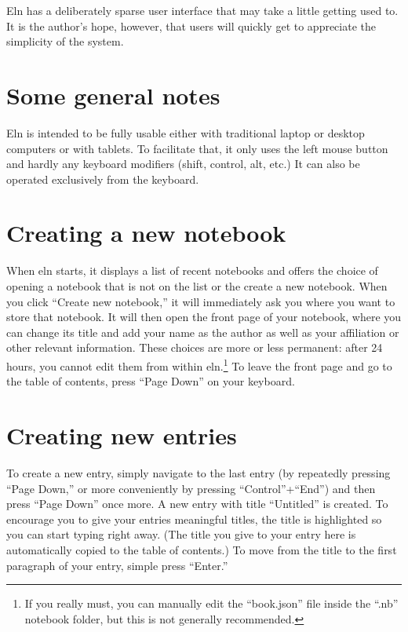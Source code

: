 \documentclass[11pt]{report}
\begin{document}
Eln has a deliberately sparse user interface that may take a little
getting used to. It is the author's hope, however, that users will
quickly get to appreciate the simplicity of the system.

\section{Some general notes}

Eln is intended to be fully usable either with traditional laptop or desktop
computers or with tablets. To facilitate that, it only uses the left
mouse button and hardly any keyboard modifiers (shift, control, alt,
etc.) It can also be operated exclusively from the keyboard.

\section{Creating a new notebook}

When eln starts, it displays a list of recent notebooks and offers the
choice of opening a notebook that is not on the list or the create a
new notebook. When you click ``Create new notebook,'' it will
immediately ask you where you want to store that notebook. It will
then open the front page of your notebook, where you can change its
title and add your name as the author as well as your affiliation or
other relevant information. These choices are more or less permanent:
after 24 hours, you cannot edit them from within eln.\footnote{If you
  really must, you can manually edit the ``book.json'' file inside the
  ``.nb'' notebook folder, but this is not generally recommended.} To
leave the front page and go to the table of contents, press ``Page
Down'' on your keyboard.

\section{Creating new entries}

To create a new entry, simply navigate to the last entry (by
repeatedly pressing ``Page Down,'' or more conveniently by pressing
``Control''+``End'') and then press ``Page Down'' once more. A new
entry with title ``Untitled'' is created. To encourage you to give
your entries meaningful titles, the title is highlighted so you can
start typing right away. (The title you give to your entry here is
automatically copied to the table of contents.) To move from the title
to the first paragraph of your entry, simple press ``Enter.''
\end{document}
